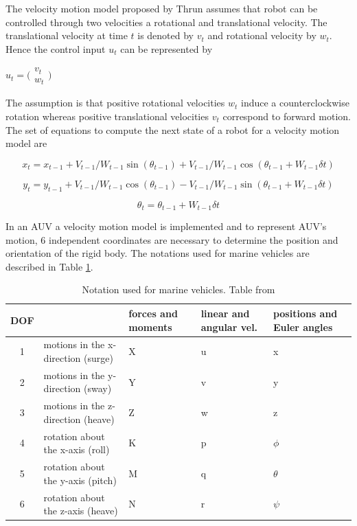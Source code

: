 \documentclass[12pt,draft]{dalcsthesis}
\begin{document}
The velocity motion model proposed by Thrun \cite{thrun2005probabilistic} assumes that robot can be controlled through two velocities a rotational and translational velocity. The translational velocity at time $t$ is denoted by $v_{t}$ and rotational velocity by $w_{t}$. Hence the control input $u_{t}$ can be represented by  
\begin{center}
$u_{t}=\bigl(\begin{array}{c}
                v_{t} \\
                w_{t}
               \end{array}\bigr)$
  
\end{center}

The assumption is that positive rotational velocities $w_{t}$ induce a counterclockwise rotation whereas positive translational velocities $v_{t}$ correspond to forward motion. The set of equations to compute the next state of a robot for a velocity motion model are 

\begin{equation}
 x_{t}=x_{t-1}+V_{t-1}/W_{t-1} \sin(\theta_{t-1})+ V_{t-1}/W_{t-1} \cos(\theta_{t-1} + W_{t-1} \delta t)
\end{equation}

\begin{equation}
\label{eq:velocity motion model_y}
y_{t}=y_{t-1}+V_{t-1}/W_{t-1} \cos(\theta_{t-1})- V_{t-1}/W_{t-1} \sin(\theta_{t-1} + W_{t-1} \delta t)
\end{equation}

\begin{equation}
\label{eq:velocity motion model_theta}
\theta_{t}=\theta_{t-1}+ W_{t-1} \delta t
\end{equation}
 


In an AUV a velocity motion model is implemented and to represent AUV's motion, 6 independent coordinates are necessary to determine the position and orientation of the rigid body. The notations used for marine vehicles are described in Table \ref{marine notation}. 

\begin{table}[tbh]
\centering
\label{marine notation}
\begin{tabular}{|c|>{\centering}p{3cm}|>{\centering}p{3cm}|>{\centering}p{3cm}|>{\centering}p{3cm}|}
\hline 
DOF &  & forces and moments & linear and angular vel. & positions and Euler angles\tabularnewline
\hline 
\hline 
1 & motions in the x-direction (surge) & X & u & x\tabularnewline
\hline 
2 & motions in the y-direction (sway) & Y & v & y\tabularnewline
\hline 
3 & motions in the z-direction (heave) & Z & w & z\tabularnewline
\hline 
4 & rotation about the x-axis (roll) & K & p & $\phi$\tabularnewline
\hline 
5 & rotation about the y-axis (pitch) & M & q & $\theta$\tabularnewline
\hline 
6 & rotation about the z-axis (heave) & N & r & $\psi$\tabularnewline
\hline 
\end{tabular}
\caption{Notation used for marine vehicles. Table from \cite{Thor}}
\end{table}
\end{document}
